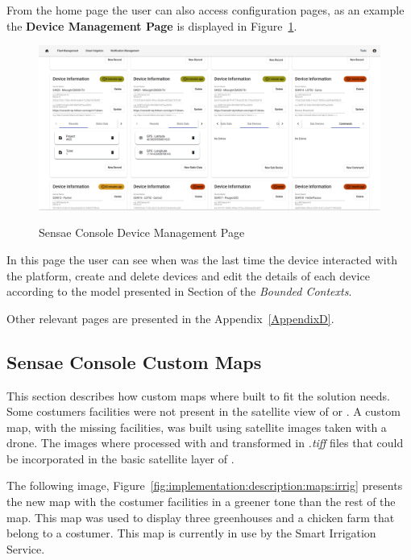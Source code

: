 From the home page the user can also access configuration pages, as an example the \textbf{Device Management Page} is displayed in Figure~\ref{fig:implementation:description:ui:device}.

\begin{figure}[H]
    \centering
    \resizebox{\columnwidth}{!}
    {
       \includegraphics{assets/figures/ui/device-management.png}
    }
    \caption[Sensae Console Device Management Page]{Sensae Console Device Management Page}
    \label{fig:implementation:description:ui:device}
\end{figure}

In this page the user can see when was the last time the device interacted with the platform, create and delete devices and edit the details of each device according to the model presented in Section of the \textit{Bounded Contexts}.

Other relevant pages are presented in the Appendix~\ref{AppendixD}.

\subsection{Sensae Console Custom Maps}
\label{subsec:implementation:description:maps}

This section describes how custom maps where built to fit the solution needs. Some costumers facilities were not present in the satellite view of  or . A custom map, with the missing facilities, was built using satellite images taken with a drone. The images where processed with  and transformed in \textit{.tiff} files that could be incorporated in the basic satellite layer of .

The following image, Figure~\ref{fig:implementation:description:maps:irrig} presents the new map with the costumer facilities in a greener tone than the rest of the map. This map was used to display three greenhouses and a chicken farm that belong to a costumer. This map is currently in use by the Smart Irrigation Service.

